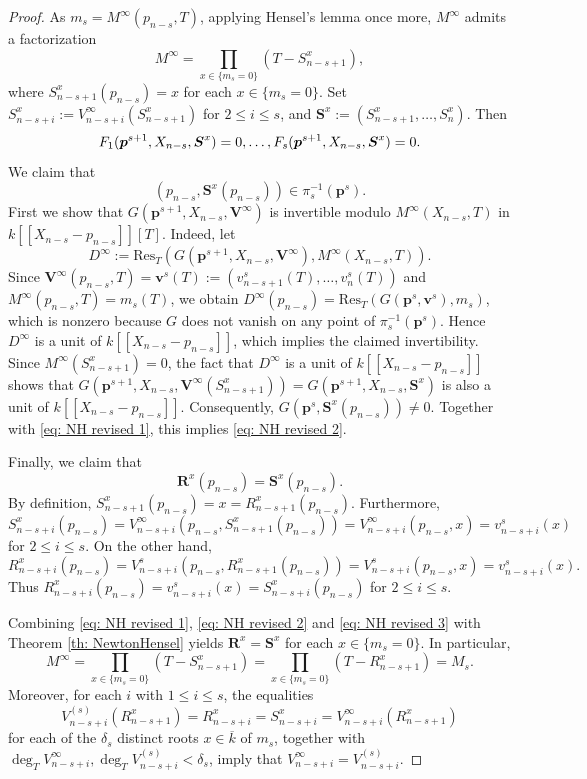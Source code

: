 \documentclass[pdflatex,sn-basic]{sn-jnl}%
\theoremstyle{thmstyleone}%
\theoremstyle{thmstyletwo}%
\theoremstyle{thmstylethree}%
\theoremstyle{definition}
\numberwithin{equation}{section}
\newcommand{\bfs}{\boldsymbol}
\def\ifm#1#2{\relax \ifmmode#1\else#2\fi}
\newcommand{\klk}    {\ifm {,\ldots,} {$,\ldots,$}}
\begin{document}
\begin{proof}
As $m_s=M^\infty(p_{n-s},T)$, applying Hensel's lemma once more,
$M^\infty$ admits a factorization %
%
$$M^\infty=\prod_{x \in \{m_s=0\}}(T-S_{n-s+1}^{x}),$$
%
where $S_{n-s+1}^x(p_{n-s})=x$ for each $x\in\{m_s=0\}$. Set
$S_{n-s+i}^x:=V_{n-s+i}^\infty(S_{n-s+1}^x)$ for $2\le i\le s$, and
$\bfs S^x:=(S_{n-s+1}^x, \ldots, S_n^x)$. Then
%
\begin{equation}\label{eq: NH revised 1}
F_1(\bfs p^{s+1}, X_{n-s},\bfs S^x)=0\klk F_s(\bfs p^{s+1}, X_{n-s},\bfs S^x)=0.
\end{equation}
%
We claim that
\begin{equation}\label{eq: NH revised 2}
(p_{n-s},\bfs S^x(p_{n-s}))\in\pi_s^{-1}(\bfs p^s).
\end{equation}
%
First we show that $G(\bfs p^{s+1},X_{n-s},\bfs V^\infty)$
is invertible modulo $M^\infty(X_{n-s},T)$ in $k[\![X_{n-s}-p_{n-s}]\!][T]$.
Indeed, let 
%
$$D^\infty:=\mathrm{Res}_T(G(\bfs p^{s+1},X_{n-s},\bfs V^\infty),M^\infty(X_{n-s},T)).$$
%
Since $\bfs V^\infty(p_{n-s},T)=\bfs v^s(T):=(v^s_{n-s+1}(T),\ldots,v^s_n(T))$ and
$M^\infty(p_{n-s},T)=m_s(T)$, we obtain  
$D^\infty(p_{n-s})=\mathrm{Res}_T(G(\bfs p^{s},\bfs v^s),m_s)$, which is nonzero
because $G$ does not vanish on any point of $\pi_s^{-1}(\bfs p^s)$. Hence
$D^\infty$ is a unit of $k[\![X_{n-s}-p_{n-s}]\!]$, which implies the 
claimed invertibility. Since $M^\infty(S_{n-s+1}^x)=0$, the fact that
$D^\infty$ is a unit of $k[\![X_{n-s}-p_{n-s}]\!]$ shows that 
$G(\bfs p^{s+1},X_{n-s},\bfs V^\infty(S_{n-s+1}^x))=
G(\bfs p^{s+1},X_{n-s},\bfs S^x)$ is also a unit of $k[\![X_{n-s}-p_{n-s}]\!]$.
Consequently, $G(\bfs p^s,\bfs S^x(p_{n-s}))\not=0$. Together
with \eqref{eq: NH revised 1}, this implies \eqref{eq: NH revised 2}.

Finally, we claim that 
%
\begin{equation}\label{eq: NH revised 3}
\bfs R^x(p_{n-s})=\bfs S^x(p_{n-s}). 
\end{equation}
%
By definition, 
$S_{n-s+1}^x(p_{n-s})=x=R_{n-s+1}^x(p_{n-s})$. Furthermore,
%
$$S_{n-s+i}^x(p_{n-s})=V_{n-s+i}^\infty(p_{n-s},S_{n-s+1}^x(p_{n-s}))
=V_{n-s+i}^\infty(p_{n-s},x)=v_{n-s+i}^s(x)$$
%
for $2\le i\le s$. On the other hand,  
%
$$R_{n-s+i}^x(p_{n-s})=V_{n-s+i}^s(p_{n-s},R_{n-s+1}^x(p_{n-s}))
=V_{n-s+i}^s(p_{n-s},x)=v_{n-s+i}^s(x).$$
%
Thus $R_{n-s+i}^x(p_{n-s})=v_{n-s+i}^s(x)=S_{n-s+i}^x(p_{n-s})$ for 
$2\le i\le s$. 

Combining \eqref{eq: NH revised 1}, \eqref{eq: NH revised 2} and
\eqref{eq: NH revised 3} with Theorem \ref{th: NewtonHensel} yields $\bfs R^x=\bfs S^x$
for each $x\in \{m_s=0\}$. In particular,
%
$$M^\infty=\prod_{x \in \{m_s=0\}}(T-S_{n-s+1}^{x})=
\prod_{x \in \{m_s=0\}}(T-R_{n-s+1}^{x})=M_s.$$
%
Moreover, for each $i$ with $1\le i\le s$, the equalities
%
$$V^{(s)}_{n-s+i}(R_{n-s+1}^x)=R_{n-s+i}^x=S_{n-s+i}^x=V_{n-s+i}^\infty(R_{n-s+1}^x)$$
%
for each of the $\delta_s$ distinct roots $x \in\overline{k}$ of
$m_s$, together with
$\deg_TV_{n-s+i}^{\infty},\deg_TV_{n-s+i}^{(s)}<\delta_s$,
imply that $V_{n-s+i}^{\infty}=V^{(s)}_{n-s+i}$.


\end{proof}
\end{document}
